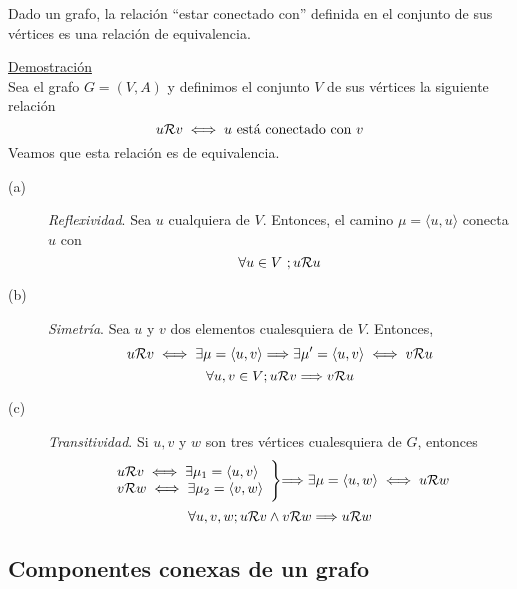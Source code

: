 \begin{fondo}
Dado un grafo, la relación ``estar conectado con'' definida en el conjunto de sus vértices es una relación de equivalencia.
\end{fondo}

\underline{Demostración}\\

Sea el grafo $G = (V,A)$ y definimos el conjunto $V$ de sus vértices la siguiente relación
\[ u {\cal{R}} v \iff u\ \mbox{está conectado con}\ v\]
Veamos que esta relación es de equivalencia.\\
\begin{description}
\item[(a)]\emph{Reflexividad}. Sea $u$ cualquiera de $V$. Entonces, el camino $\mu = \langle u, u \rangle$ conecta $u$ con \\ \hspace*{-.1in}{$u$, luego}
\[ \forall u \in V\ ; u {\cal{R}} u \]
\hspace*{-.1in}{es decir $\cal R$ es reflexiva.}
\item[(b)]\emph{Simetría}. Sea $u$ y $v$ dos elementos cualesquiera de $V$. Entonces,
\[ u {\cal{R}} v \iff \exists \mu = \langle u, v \rangle \Longrightarrow \exists \mu' = \langle u, v \rangle \iff v {\cal{R}} u \]
\hspace*{-.1in}{luego,}
\[ \forall u, v \in V ; u {\cal{R}} v \Longrightarrow v {\cal{R}} u \]
\item[(c)]\emph{Transitividad}. Si $u,v$ y $w$ son tres vértices cualesquiera de $G$, entonces
\[
  \begin{array}{l}
    u {\cal{R}} v \iff \exists \mu_1 = \langle u, v \rangle \\
    v {\cal{R}} w \iff \exists \mu_2 = \langle v, w \rangle \\
  \end{array}
  \Biggl\} \Longrightarrow \exists \mu = \langle u, w \rangle \iff u {\cal{R}} w
\]
\hspace*{-.1in}{Bastaría, pues, con unir los caminos $\mu_1$ y $\mu_2$. Por lo tanto}
\[ \forall u, v, w ; u {\cal{R}} v \land v {\cal{R}} w \Longrightarrow u {\cal{R}} w \]
\end{description}

\subsection{Componentes conexas de un grafo}

